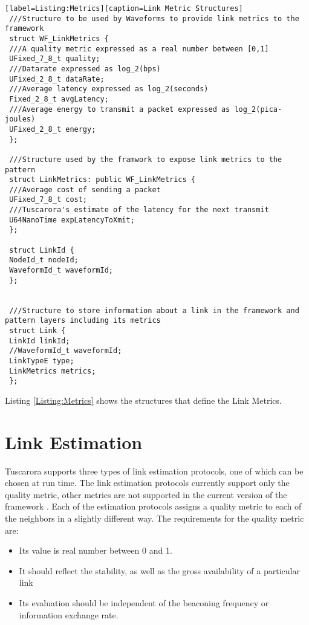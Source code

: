 \begin{lstlisting}[style=boralargefile][label=Listing:Metrics][caption=Link Metric Structures]
 ///Structure to be used by Waveforms to provide link metrics to the framework
 struct WF_LinkMetrics {
 ///A quality metric expressed as a real number between [0,1]
 UFixed_7_8_t quality;
 ///Datarate expressed as log_2(bps)
 UFixed_2_8_t dataRate; 
 ///Average latency expressed as log_2(seconds)
 Fixed_2_8_t avgLatency;
 ///Average energy to transmit a packet expressed as log_2(pica-joules)
 UFixed_2_8_t energy;
 };
 
 ///Structure used by the framwork to expose link metrics to the pattern
 struct LinkMetrics: public WF_LinkMetrics {
 ///Average cost of sending a packet
 UFixed_7_8_t cost;
 ///Tuscarora's estimate of the latency for the next transmit
 U64NanoTime expLatencyToXmit;
 };
 
 struct LinkId {
 NodeId_t nodeId;
 WaveformId_t waveformId;
 };
 
 
 ///Structure to store information about a link in the framework and pattern layers including its metrics
 struct Link {
 LinkId linkId;
 //WaveformId_t waveformId;
 LinkTypeE type;
 LinkMetrics metrics;
 };
\end{lstlisting}
\label{Listing:Metrics}

Listing \cref{Listing:Metrics} shows the structures that define the Link Metrics.


\section{Link Estimation}

Tuscarora supports three types of link estimation protocols, one of which can be chosen at run time.  The link estimation protocols currently support only the quality metric, other metrics are not supported in the current version of the framework . Each of the estimation protocols assigns a quality metric to each of the neighbors in a slightly different way. The requirements for the quality metric are:

\begin{itemize}
	\item Its value is real number between 0 and 1.
	\item It should reflect the stability, as well as the gross availability of a particular link
	\item Its evaluation should be independent of the beaconing frequency or information exchange rate.
\end{itemize} 


